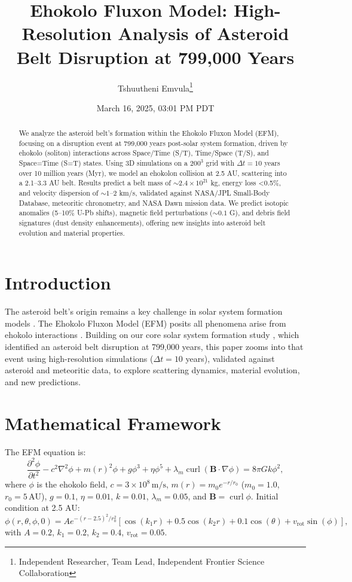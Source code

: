 \documentclass[11pt]{article}
\title{Ehokolo Fluxon Model: High-Resolution Analysis of Asteroid Belt Disruption at 799,000 Years}
\author{Tshuutheni Emvula\thanks{Independent Researcher, Team Lead, Independent Frontier Science Collaboration}}
\date{March 16, 2025, 03:01 PM PDT}
\DeclareMathOperator{\curl}{curl}
\begin{document}
\maketitle

\begin{abstract}
We analyze the asteroid belt’s formation within the Ehokolo Fluxon Model (EFM), focusing on a disruption event at 799,000 years post-solar system formation, driven by ehokolo (soliton) interactions across Space/Time (S/T), Time/Space (T/S), and Space=Time (S=T) states. Using 3D simulations on a $200^3$ grid with \(\Delta t = 10\) years over 10 million years (Myr), we model an ehokolon collision at 2.5 AU, scattering into a 2.1--3.3 AU belt. Results predict a belt mass of $\sim 2.4 \times 10^{21}$ kg, energy loss <0.5\%, and velocity dispersion of $\sim 1$--$2$ km/s, validated against NASA/JPL Small-Body Database, meteoritic chronometry, and NASA Dawn mission data. We predict isotopic anomalies (5--10\% U-Pb shifts), magnetic field perturbations ($\sim 0.1$ G), and debris field signatures (dust density enhancements), offering new insights into asteroid belt evolution and material properties.
\end{abstract}

\section{Introduction}
The asteroid belt’s origin remains a key challenge in solar system formation models \cite{morbidelli2012}. The Ehokolo Fluxon Model (EFM) posits all phenomena arise from ehokolo interactions \cite{emvula2025compendium}. Building on our core solar system formation study \cite{emvula2025formation}, which identified an asteroid belt disruption at 799,000 years, this paper zooms into that event using high-resolution simulations (\(\Delta t = 10\) years), validated against asteroid and meteoritic data, to explore scattering dynamics, material evolution, and new predictions.

\section{Mathematical Framework}
The EFM equation is:
\begin{equation}
\frac{\partial^2 \phi}{\partial t^2} - c^2 \nabla^2 \phi + m(r)^2 \phi + g \phi^3 + \eta \phi^5 + \lambda_m \curl (\mathbf{B} \cdot \nabla \phi) = 8\pi G k \phi^2,
\end{equation}
where \(\phi\) is the ehokolo field, \(c = 3 \times 10^8 \, \text{m/s}\), \(m(r) = m_0 e^{-r/r_0}\) (\(m_0 = 1.0\), \(r_0 = 5 \, \text{AU}\)), \(g = 0.1\), \(\eta = 0.01\), \(k = 0.01\), \(\lambda_m = 0.05\), and \(\mathbf{B} = \curl \phi\). Initial condition at 2.5 AU:
\begin{equation}
\phi(r, \theta, \phi, 0) = A e^{-(r-2.5)^2 / r_0^2} \left[ \cos(k_1 r) + 0.5 \cos(k_2 r) + 0.1 \cos(\theta) + v_{\text{rot}} \sin(\phi) \right],
\end{equation}
with \(A = 0.2\), \(k_1 = 0.2\), \(k_2 = 0.4\), \(v_{\text{rot}} = 0.05\).
\end{document}
